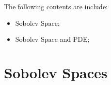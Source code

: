 \documentclass[Total.tex]{subfiles}
\begin{document}
	The following contents are include:
	\begin{itemize}
		\item Sobolev Space;
		\item Sobolev Space and PDE;
	\end{itemize}
	
	\chapter{Sobolev Spaces}
\end{document}

